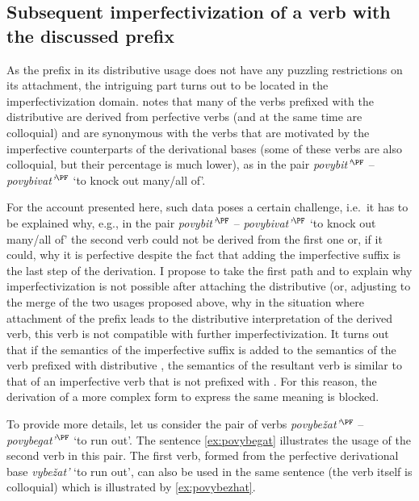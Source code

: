 \subsection{Subsequent imperfectivization of a verb with the discussed prefix}
As the prefix  in its distributive usage does not have any puzzling restrictions on its attachment, the intriguing part turns out to be located in the imperfectivization domain. \citet[365]{Shvedova:82} notes that many of the verbs prefixed with the distributive  are derived from perfective verbs (and at the same time are colloquial) and are synonymous with the verbs that are motivated by the imperfective counterparts of the derivational bases (some of these verbs are also colloquial, but their percentage is much lower), as in the pair \textit{povybit'}$^{\PF}$ -- \textit{povybivat'}$^{\PF}$ `to knock out many/all of'.

For the account presented here, such data poses a certain challenge, i.e.\ it has to be explained why, e.g., in the pair \textit{povybit'}$^{\PF}$ -- \textit{povybivat'}$^{\PF}$ `to knock out many/all of' the second verb could not be derived from the first one or, if it could, why it is perfective despite the fact that adding the imperfective suffix is the last step of the derivation. I propose to take the first path and to explain why imperfectivization is not possible after attaching the distributive  (or, adjusting to the merge of the two usages proposed above, why in the situation where attachment of the prefix  leads to the distributive interpretation of the derived verb, this verb is not compatible with further imperfectivization. It turns out that if the semantics of the imperfective suffix is added to the semantics of the verb prefixed with distributive , the semantics of the resultant verb is similar to that of an imperfective verb that is not prefixed with . For this reason, the derivation of a more complex form to express the same meaning is blocked.

To provide more details, let us consider the pair of verbs \textit{povybe\v{z}at'}$^{\PF}$ -- \textit{po\-vy\-be\-gat'}$^{\PF}$ `to run out'. The sentence \ref{ex:povybegat} illustrates the usage of the second verb in this pair. The first verb, formed from the perfective derivational base \textit{vybe\v{z}at'} `to run out', can also be used in the same sentence (the verb itself is colloquial) which is illustrated by \ref{ex:povybezhat}.

